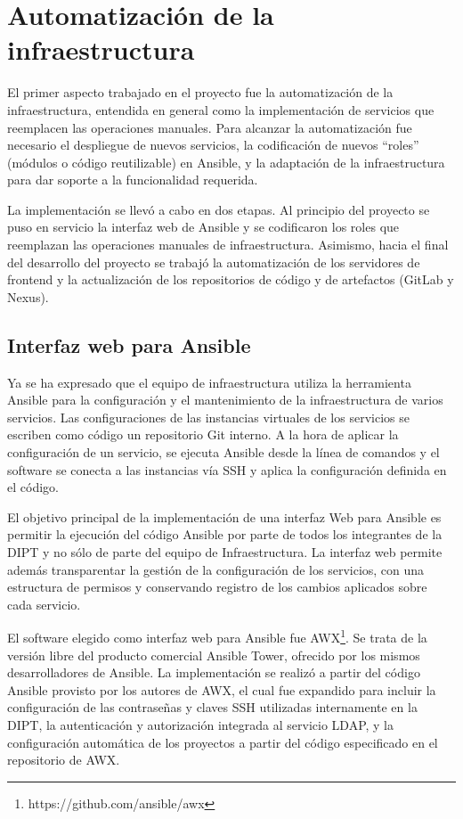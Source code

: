 \chapter{Automatización de la infraestructura}

El primer aspecto trabajado en el proyecto fue la automatización de la
infraestructura, entendida en general como la implementación de
servicios que reemplacen las operaciones manuales. Para alcanzar la
automatización fue necesario el despliegue de nuevos servicios, la
codificación de nuevos ``roles'' (módulos o código reutilizable) en
Ansible, y la adaptación de la infraestructura para dar soporte a la
funcionalidad requerida.

La implementación se llevó a cabo en dos etapas. Al principio del
proyecto se puso en servicio la interfaz web de Ansible y se
codificaron los roles que reemplazan las operaciones manuales de
infraestructura. Asimismo, hacia el final del desarrollo del proyecto
se trabajó la automatización de los servidores de frontend y la
actualización de los repositorios de código y de artefactos (GitLab y
Nexus).

\section{Interfaz web para Ansible}

Ya se ha expresado que el equipo de infraestructura utiliza la
herramienta Ansible para la configuración y el mantenimiento de la
infraestructura de varios servicios. Las configuraciones de las
instancias virtuales de los servicios se escriben como código un
repositorio Git interno. A la hora de aplicar la configuración de un
servicio, se ejecuta Ansible desde la línea de comandos y el software
se conecta a las instancias vía SSH y aplica la configuración definida
en el código.

El objetivo principal de la implementación de una interfaz Web para
Ansible es permitir la ejecución del código Ansible por parte de todos
los integrantes de la DIPT y no sólo de parte del equipo de
Infraestructura. La interfaz web permite además transparentar la
gestión de la configuración de los servicios, con una estructura de
permisos y conservando registro de los cambios aplicados sobre cada
servicio.

El software elegido como interfaz web para Ansible fue AWX\footnote{
  https://github.com/ansible/awx}. Se trata de la versión libre del
producto comercial Ansible Tower, ofrecido por los mismos
desarrolladores de Ansible. La implementación se realizó a partir del
código Ansible provisto por los autores de AWX, el cual fue expandido
para incluir la configuración de las contraseñas y claves SSH
utilizadas internamente en la DIPT, la autenticación y autorización
integrada al servicio LDAP, y la configuración automática de los
proyectos a partir del código especificado en el repositorio de AWX.

